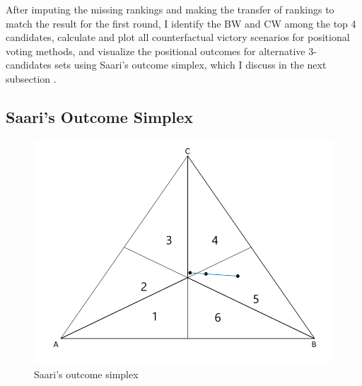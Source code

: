 \documentclass[hidelinks,11pt]{article} \usepackage[utf8]{inputenc}
\begin{document}
After imputing the missing rankings and making the transfer of rankings to match
the result for the first round, I identify the BW and CW among the top 4
candidates, calculate and plot all counterfactual victory scenarios for
positional voting methods, and visualize the positional outcomes for alternative
3-candidates sets using Saari's outcome simplex, which I discuss in the next subsection \parencite{saari1995basic}.


\subsection{Saari's Outcome Simplex}
\begin{figure}[H] \centering \includegraphics[width=0.8\columnwidth,
height=0.3\textheight]{./images/simpletriangle.png}
 \caption{Saari's outcome simplex}
 \label{fig:saari_nurmi}
\end{figure}
\end{document}
